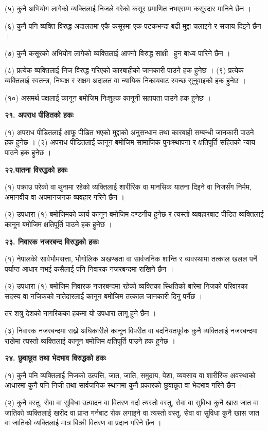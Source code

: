 (५) कुनै अभियोग लागेको व्यक्तिलाई निजले गरेको कसूर प्रमाणित नभएसम्म कसूरदार मानिने छैन ।

(६) कुनै पनि व्यक्ति विरुद्ध अदालतमा एकै कसूरमा एक पटकभन्दा बढी मुद्दा चलाइने र सजाय दिइने छैन ।

(७) कुनै कसूरको अभियोग लागेको व्यक्तिलाई आफ्नो विरुद्ध साक्षी  हुन बाध्य पारिने छैन ।

(८) प्रत्येक व्यक्तिलाई निज विरुद्ध गरिएको कारबाहीको जानकारी पाउने हक हुनेछ ।
(९) प्रत्येक व्यक्तिलाई स्वतन्त्र, निष्पक्ष र सक्षम अदालत वा न्यायिक निकायबाट स्वच्छ सुनुवाइको हक हुनेछ ।

(१०) असमर्थ पक्षलाई कानून बमोजिम निःशुल्क कानूनी सहायता पाउने हक हुनेछ ।

\textbf{२१. अपराध पीडितको हकः}

(१) अपराध पीडितलाई आफू पीडित भएको मुद्दाको अनुसन्धान तथा कारबाही सम्बन्धी जानकारी पाउने हक हुनेछ ।
(२) अपराध पीडितलाई कानून बमोजिम सामाजिक पुनःस्थापना र क्षतिपूर्ति सहितको न्याय पाउने हक हुनेछ ।

\textbf{२२.यातना विरुद्धको हकः}

(१) पक्राउ परेको वा थुनामा रहेको व्यक्तिलाई शारीरिक वा मानसिक यातना दिइने वा निजसँग निर्मम, अमानवीय वा अपमानजनक व्यवहार गरिने छैन ।

(२) उपधारा (१) बमोजिमको कार्य कानून बमोजिम दण्डनीय हुनेछ र त्यस्तो व्यवहारबाट पीडित व्यक्तिलाई कानून बमोजिम क्षतिपूर्ति पाउने हक हुनेछ ।

\textbf{२३. निवारक नजरबन्द विरुद्धको हकः}

(१) नेपालकोे सार्वभौमसत्ता, भौगोलिक अखण्डता वा सार्वजनिक शान्ति र व्यवस्थामा तत्काल खलल पर्ने पर्याप्त आधार नभई कसैलाई पनि निवारक नजरबन्दमा राखिने छैन ।

(२) उपधारा (१) बमोजिम निवारक नजरबन्दमा रहेको व्यक्तिका स्थितिको बारेमा निजको परिवारका सदस्य वा नजिकको नातेदारलाई कानून बमोजिम तत्काल जानकारी दिनु पर्नेछ ।

तर शत्रु देशको नागरिकका हकमा यो उपधारा लागू हुने छैन ।

(३) निवारक नजरबन्दमा राख्ने अधिकारीले कानून विपरीत वा बदनियतपूर्वक कुनै व्यक्तिलाई नजरबन्दमा राखेमा त्यस्तो व्यक्तिलाई कानून बमोजिम क्षतिपूर्ति पाउने हक हुनेछ ।

\textbf{२४. छुवाछूत तथा भेदभाव विरुद्धको हकः}

(१) कुनै पनि व्यक्तिलाई निजको उत्पत्ति, जात, जाति, समुदाय, पेशा, व्यवसाय वा शारीरिक अवस्थाको आधारमा कुनै पनि निजी तथा सार्वजनिक स्थानमा कुनै प्रकारको छुवाछूत वा भेदभाव गरिने छैन ।

(२) कुनै वस्तु, सेवा वा सुविधा उत्पादन वा वितरण गर्दा त्यस्तो वस्तु, सेवा वा सुविधा कुनै खास जात वा जातिको व्यक्तिलाई खरीद वा प्राप्त गर्नबाट रोक लगाइने वा त्यस्तो वस्तु, सेवा वा सुविधा कुनै खास जात वा जातिको व्यक्तिलाई मात्र बिक्री वितरण वा प्रदान गरिने छैन ।

